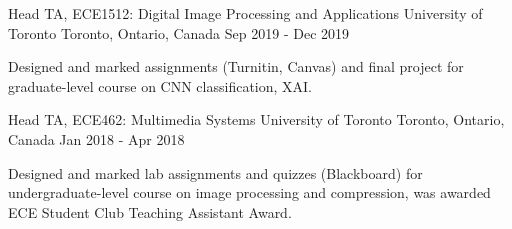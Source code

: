 

\begin{cventries}

  \cventry
    {Head TA, ECE1512: Digital Image Processing and Applications} %
    {University of Toronto} %
    {Toronto, Ontario, Canada} %
    {Sep 2019 - Dec 2019} %
    {
      \begin{cvitems} %
        \item {Designed and marked assignments (Turnitin, Canvas) and final project for graduate-level course on CNN classification, XAI.}
      \end{cvitems}
    }

  \cventry
    {Head TA, ECE462: Multimedia Systems} %
    {University of Toronto} %
    {Toronto, Ontario, Canada} %
    {Jan 2018 - Apr 2018} %
    {
      \begin{cvitems} %
        \item {Designed and marked lab assignments and quizzes (Blackboard) for undergraduate-level course on image processing and compression, was awarded ECE Student Club Teaching Assistant Award.}
      \end{cvitems}
    }

\end{cventries}
